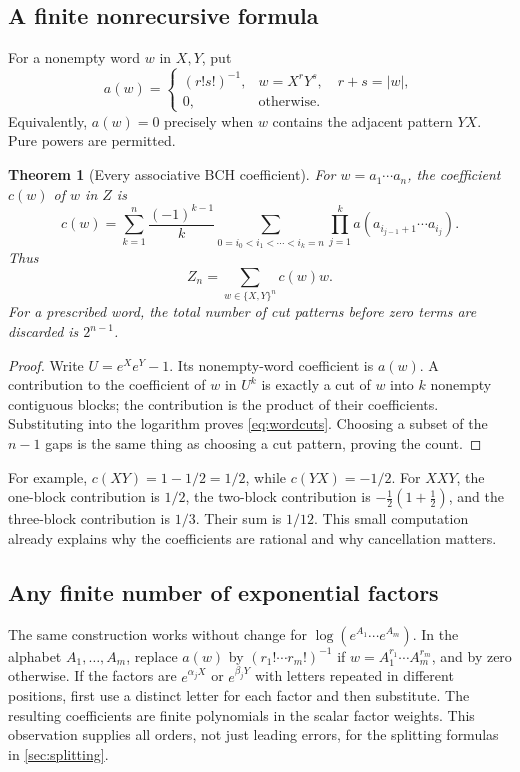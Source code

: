 \documentclass[11pt]{article}
\numberwithin{equation}{section}
\newtheorem{theorem}{Theorem}[section]
\theoremstyle{definition}
\theoremstyle{remark}
\begin{document}
\subsection{A finite nonrecursive formula}
For a nonempty word $w$ in $X,Y$, put
\begin{equation}\label{eq:blockweight}
 a(w)=
 \begin{cases}
 (r!s!)^{-1},&w=X^rY^s,\quad r+s=|w|,\\
 0,&\text{otherwise}.
 \end{cases}
\end{equation}
Equivalently, $a(w)=0$ precisely when $w$ contains the adjacent pattern
$YX$. Pure powers are permitted.

\begin{theorem}[Every associative BCH coefficient]\label{thm:wordcuts}
For $w=a_1\cdots a_n$, the coefficient $c(w)$ of $w$ in $Z$ is
\begin{equation}\label{eq:wordcuts}
 c(w)=\sum_{k=1}^{n}\frac{(-1)^{k-1}}k
 \sum_{0=i_0<i_1<\cdots<i_k=n}
 \prod_{j=1}^{k}a(a_{i_{j-1}+1}\cdots a_{i_j}).
\end{equation}
Thus
\begin{equation}\label{eq:wordexpansion}
 Z_n=\sum_{w\in\{X,Y\}^n}c(w)w.
\end{equation}
For a prescribed word, the total number of cut patterns before zero
terms are discarded is $2^{n-1}$.
\end{theorem}
\begin{proof}
Write $U=e^Xe^Y-1$. Its nonempty-word coefficient is $a(w)$.
A contribution to the coefficient of $w$ in $U^k$ is exactly a cut of
$w$ into $k$ nonempty contiguous blocks; the contribution is the product
of their coefficients. Substituting into the logarithm proves
\eqref{eq:wordcuts}. Choosing a subset of the $n-1$ gaps is the same
thing as choosing a cut pattern, proving the count.
\end{proof}
For example, $c(XY)=1-1/2=1/2$, while $c(YX)=-1/2$.
For $XXY$, the one-block contribution is $1/2$, the two-block
contribution is $-\tfrac12(1+\tfrac12)$, and the three-block contribution
is $1/3$. Their sum is $1/12$. This small computation already explains
why the coefficients are rational and why cancellation matters.

\subsection{Any finite number of exponential factors}\label{sec:multifactor}
The same construction works without change for
$\log(e^{A_1}\cdots e^{A_m})$. In the alphabet $A_1,\ldots,A_m$, replace
$a(w)$ by $(r_1!\cdots r_m!)^{-1}$ if
$w=A_1^{r_1}\cdots A_m^{r_m}$, and by zero otherwise. If the factors are
$e^{\alpha_j X}$ or $e^{\beta_jY}$ with letters repeated in different
positions, first use a distinct letter for each factor and then substitute.
The resulting coefficients are finite polynomials in the scalar factor
weights. This observation supplies all orders, not just leading errors,
for the splitting formulas in \cref{sec:splitting}.
\end{document}
